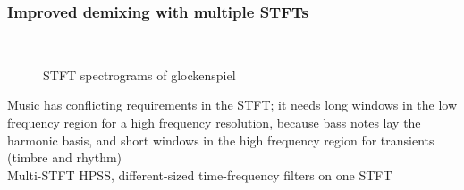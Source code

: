 \documentclass[usenames,dvipsnames]{beamer}
\begin{document}
\begin{frame}
	\frametitle{Improved demixing with multiple STFTs}
	\begin{figure}[ht]
		\vspace{-1em}
		\centering
		\hspace{0.5em}
		\\
		\caption{STFT spectrograms of glockenspiel}
		\vspace{-1em}
	\end{figure}
	Music has conflicting requirements in the STFT; it needs long windows in the low frequency region for a high frequency resolution, because bass notes lay the harmonic basis, and short windows in the high frequency region for transients (timbre and rhythm)\\
	Multi-STFT HPSS, different-sized time-frequency filters on one STFT
\end{frame}
\end{document}
